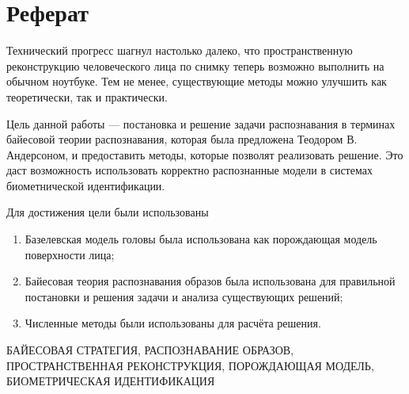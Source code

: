 \chapter*{Реферат}

Технический прогресс шагнул настолько далеко,
что пространственную реконструкцию человеческого лица по снимку
теперь возможно выполнить на обычном ноутбуке.
Тем не менее,
существующие методы можно улучшить как теоретически, так и практически.

Цель данной работы --- постановка и решение задачи распознавания
в терминах байесовой теории распознавания,
которая была предложена Теодором В. Андерсоном,
и предоставить методы, которые позволят реализовать решение.
Это даст возможность использовать корректно распознанные модели
в системах биометнической идентификации.

Для достижения цели были использованы
\begin{enumerate}
  \item
    Базелевская модель головы была использована
    как порождающая модель поверхности лица;
  \item
    Байесовая теория распознавания образов была использована
    для правильной постановки и решения задачи и анализа существующих решений;
  \item
    Численные методы были использованы для расчёта решения.
\end{enumerate}

\MakeUppercase{байесовая стратегия, распознавание образов,
пространственная реконструкция, порождающая модель,
биометрическая идентификация}
